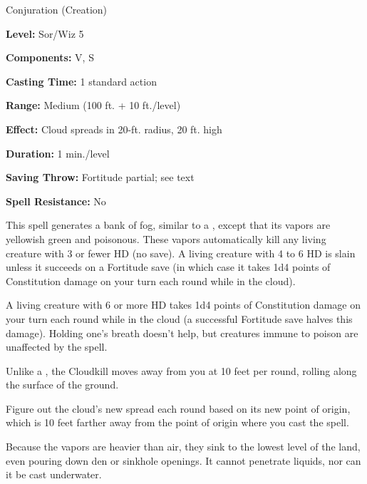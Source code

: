 
Conjuration (Creation)

\textbf{Level:} Sor/Wiz 5

\textbf{Components:} V, S

\textbf{Casting Time:} 1 standard action

\textbf{Range:} Medium (100 ft. + 10 ft./level)

\textbf{Effect:} Cloud spreads in 20-ft. radius, 20 ft. high

\textbf{Duration:} 1 min./level

\textbf{Saving Throw:} Fortitude partial; see text

\textbf{Spell Resistance:} No

This spell generates a bank of fog, similar to a , except that 
its vapors are yellowish green and poisonous. These vapors automatically kill any 
living creature with 3 or fewer HD (no save). A living creature with 4 to 6 HD 
is slain unless it succeeds on a Fortitude save (in which case it takes 1d4 points 
of Constitution damage on your turn each round while in the cloud).

A living creature with 6 or more HD takes 1d4 points of Constitution damage on 
your turn each round while in the cloud (a successful Fortitude save halves this 
damage). Holding one's breath doesn't help, but creatures immune to poison are 
unaffected by the spell.

Unlike a , the Cloudkill moves away from you at 10 feet 
per round, rolling along the surface of the ground.

Figure out the cloud's new spread each round based on its new point of origin, 
which is 10 feet farther away from the point of origin where you cast the spell.

Because the vapors are heavier than air, they sink to the lowest level of the land, 
even pouring down den or sinkhole openings. It cannot penetrate liquids, nor can 
it be cast underwater.

